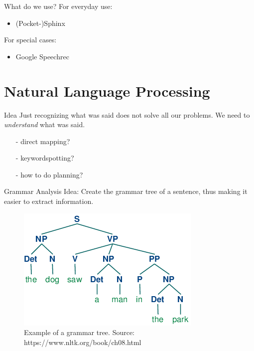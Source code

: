 \documentclass{beamer}
\begin{document}
	\begin{frame}{What do we use?}
		For everyday use:
		\pause
		\begin{itemize}
			\item (Pocket-)Sphinx
		\end{itemize}
		
		For special cases:
		\pause
		\begin{itemize}
			\item Google Speechrec
		\end{itemize}
	\end{frame}
	
	\section{Natural Language Processing}%
	
	\begin{frame}{Idea}
		Just recognizing what was said does not solve all our problems. We need to \emph{understand} what was said.
		\pause
		\begin{itemize}
			\item[-] direct mapping?
			\pause
			\item[-] keywordspotting?
			\pause
			\item[-] how to do planning?
		\end{itemize}
	\end{frame}
	
	\begin{frame}{Grammar Analysis}
		Idea: Create the grammar tree of a sentence, thus making it easier to extract information.
		
		\begin{figure}[ht]
			\centering
			\includegraphics[width=.7\linewidth]{Bilder/grammar_tree.png}
			\caption{Example of a grammar tree. Source: https://www.nltk.org/book/ch08.html}
		\end{figure}
		
	\end{frame}
	
\end{document}
